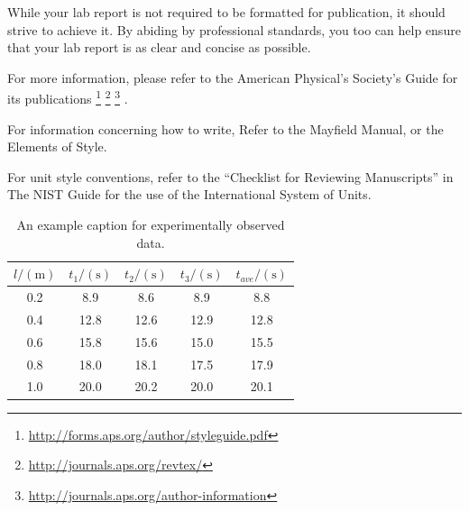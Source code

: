\documentclass[
    10pt,aps,prl,
    amsfonts,
    amssymb,
    amsmath,
    draft,
    runinaddress,
    secnum,
    showkeys,
    superscriptaddress,
    twocolumn,
]{revtex4}
\begin{document}
    While your lab report is not required to be formatted for
        publication, it should strive to achieve it.
    By abiding by professional standards, you too can help ensure
        that your lab report is as clear and concise as possible.
   
    For more information, please refer to the American Physical's
        Society's Guide for its publications
    \footnote{\url{http://forms.aps.org/author/styleguide.pdf}}
    \footnote{\url{http://journals.aps.org/revtex/}}
    \footnote{\url{http://journals.aps.org/author-information}}
    \cite{Simon:2010:SIGCSE}
    \cite{PeerInstruction}.

    For information concerning how to write,
        Refer to the Mayfield Manual\cite{Mayfield},
        or the Elements of Style\cite{StrunkWilliam}.

    For unit style conventions, refer to the ``Checklist for Reviewing Manuscripts''
        in The NIST Guide for the use of the International System of Units\cite{NISTsp811}.

    \begin{table}[h]
        \begin{ruledtabular}
        \begin{tabular}{c|ccc|c}
            $l/(\si{\meter})$ &
            $t_1/(\si{\second})$ &
            $t_2/(\si{\second})$ &
            $t_3/(\si{\second})$ &
            $t_{ave}/(\si{\second})$ \\
            \hline
            0.2 &  8.9 &  8.6 &  8.9 &  8.8 \\
            0.4 & 12.8 & 12.6 & 12.9 & 12.8 \\
            0.6 & 15.8 & 15.6 & 15.0 & 15.5 \\
            0.8 & 18.0 & 18.1 & 17.5 & 17.9 \\
            1.0 & 20.0 & 20.2 & 20.0 & 20.1 \\
        \end{tabular}
        \end{ruledtabular}
        \caption{An example caption for experimentally observed data.}
        \label{tab:data}
    \end{table}
\end{document}
